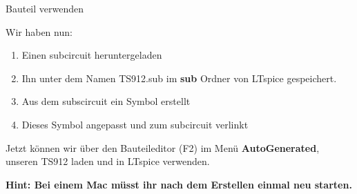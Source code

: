 \begin{frame}[t]{Bauteil verwenden}

    Wir haben nun:

    \begin{enumerate}
        \item Einen subcircuit heruntergeladen
        \item Ihn unter dem Namen TS912.sub im \textbf{sub} Ordner von LTspice gespeichert.
        \item Aus dem subscircuit ein Symbol erstellt
        \item Dieses Symbol angepasst und zum subcircuit verlinkt
    \end{enumerate}

    Jetzt können wir über den Bauteileditor (F2) im Menü \textbf{AutoGenerated}, unseren
    TS912 laden und in LTspice verwenden.

    \textbf{Hint: Bei einem Mac müsst ihr nach dem Erstellen einmal neu starten.}

\end{frame}